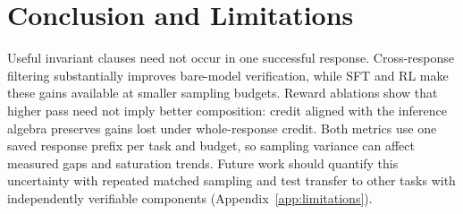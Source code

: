 \section{Conclusion and Limitations}\label{sec:conclusion}

Useful invariant clauses need not occur in one successful response.
Cross-response filtering substantially improves bare-model verification,
while SFT and RL make these gains available at smaller sampling budgets.
Reward ablations show that higher pass need not imply better composition:
credit aligned with the inference algebra preserves gains lost under
whole-response credit.  Both metrics use one saved response prefix per task
and budget, so sampling variance can affect measured gaps and saturation
trends.  Future work should quantify this uncertainty with repeated matched
sampling and test transfer to other tasks with independently verifiable
components (Appendix~\ref{app:limitations}).
